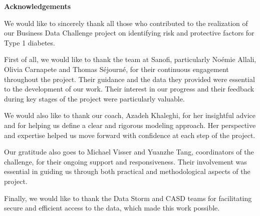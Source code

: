 
\phantom{}
\begin{center}
\textbf{\Large Acknowledgements}
\end{center}

We would like to sincerely thank all those who contributed to the realization of our Business Data Challenge project on identifying risk and protective factors for Type 1 diabetes.

First of all, we would like to thank the team at Sanofi, particularly Noémie Allali, Olivia Carnapete and Thomas Séjourné, for their continuous engagement throughout the project. Their guidance and the data they provided were essential to the development of our work. Their interest in our progress and their feedback during key stages of the project were particularly valuable.

We would also like to thank our coach, Azadeh Khaleghi, for her insightful advice and for helping us define a clear and rigorous modeling approach. Her perspective and expertise helped us move forward with confidence at each step of the project.

Our gratitude also goes to Michael Visser and Yuanzhe Tang, coordinators of the challenge, for their ongoing support and responsiveness. Their involvement was essential in guiding us through both practical and methodological aspects of the project.

Finally, we would like to thank the Data Storm and CASD teams for facilitating secure and efficient access to the data, which made this work possible.

\newpage
{}
\setcounter{page}{1}
